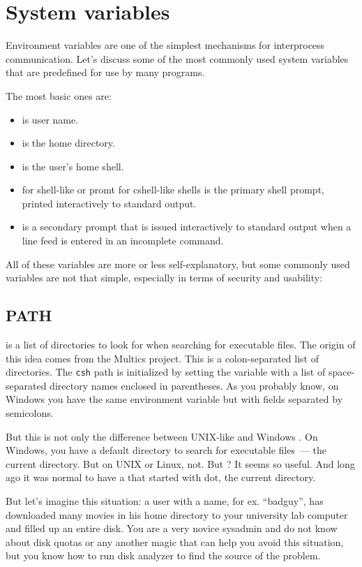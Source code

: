 \section*{System variables}

Environment variables are one of the simplest mechanisms for interprocess
communication. Let's discuss some of the most commonly used system
variables that are predefined for use by many programs.

The most basic ones are:
\begin{itemize}
\item {} is user name.
\item {} is the home directory.
\item {} is the user's home shell.
\item {} for shell-like or promt for cshell-like shells is
      the primary shell prompt, printed interactively to standard output.
\item {} is a secondary prompt that is issued interactively
      to standard output when a line feed is entered in an incomplete command.
\end{itemize}

All of these variables are more or less self-explanatory, but some
commonly used variables are not that simple, especially in terms of
security and usability:

\subsection*{PATH}

 is a list of directories to look for when searching for
executable files. The origin of this idea comes from the Multics project.
This is a colon-separated list of directories. The \verb|csh| path is initialized by
setting the variable  with a list of space-separated directory names
enclosed in parentheses. As you probably know, on Windows you have the same
environment variable but with fields separated by semicolons.

But this is not only the difference between UNIX-like and Windows .
On Windows, you have a default directory to search for executable files~---
the current directory. But on UNIX or Linux, not. But ?
It seems so useful. And long ago it was normal to have a  that
started with dot, the current directory.

But let's imagine this situation: a user with a name, for ex. ``badguy'',
has downloaded many movies in his home directory to your university lab computer
and filled up an entire disk. You are a very novice sysadmin and do not know
about disk quotas or any another magic that can help you avoid this situation,
but you know how to run disk analyzer to find the source of the problem.

